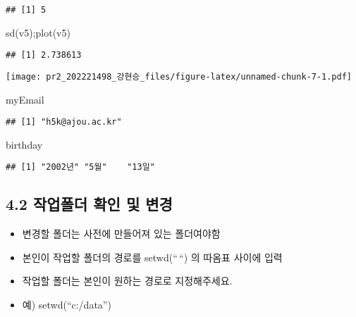 \documentclass[
]{article}
\newenvironment{Shaded}{\begin{snugshade}}{\end{snugshade}}
\newcommand{\FunctionTok}[1]{\textcolor[rgb]{0.00,0.00,0.00}{#1}}
\newcommand{\NormalTok}[1]{#1}
\providecommand{\tightlist}{%
  \setlength{\itemsep}{0pt}\setlength{\parskip}{0pt}}
\begin{document}
\begin{verbatim}
## [1] 5
\end{verbatim}

\begin{Shaded}
\begin{Highlighting}[]
\FunctionTok{sd}\NormalTok{(v5);}\FunctionTok{plot}\NormalTok{(v5)}
\end{Highlighting}
\end{Shaded}

\begin{verbatim}
## [1] 2.738613
\end{verbatim}

\texttt{[image: pr2\_202221498\_강현승\_files/figure-latex/unnamed-chunk-7-1.pdf]}

\begin{Shaded}
\begin{Highlighting}[]
\NormalTok{myEmail}
\end{Highlighting}
\end{Shaded}

\begin{verbatim}
## [1] "h5k@ajou.ac.kr"
\end{verbatim}

\begin{Shaded}
\begin{Highlighting}[]
\NormalTok{birthday}
\end{Highlighting}
\end{Shaded}

\begin{verbatim}
## [1] "2002년" "5월"    "13일"
\end{verbatim}

\hypertarget{uxc791uxc5c5uxd3f4uxb354-uxd655uxc778-uxbc0f-uxbcc0uxacbd}{%
\subsection{4.2 작업폴더 확인 및
변경}\label{uxc791uxc5c5uxd3f4uxb354-uxd655uxc778-uxbc0f-uxbcc0uxacbd}}

\begin{itemize}
\tightlist
\item
  변경할 폴더는 사전에 만들어져 있는 폴더여야함
\item
  본인이 작업할 폴더의 경로를 setwd(``\,``) 의 따옴표 사이에 입력
\item
  작업할 폴더는 본인이 원하는 경로로 지정해주세요.
\item
  예) setwd(``c:/data'')
\end{itemize}
\end{document}
